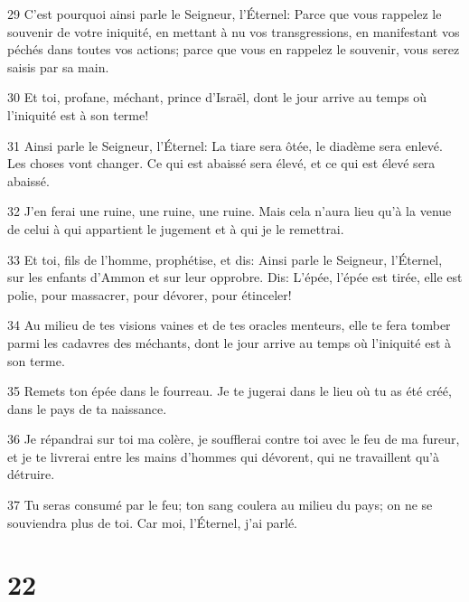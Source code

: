 \par 29 C'est pourquoi ainsi parle le Seigneur, l'Éternel: Parce que vous rappelez le souvenir de votre iniquité, en mettant à nu vos transgressions, en manifestant vos péchés dans toutes vos actions; parce que vous en rappelez le souvenir, vous serez saisis par sa main.
\par 30 Et toi, profane, méchant, prince d'Israël, dont le jour arrive au temps où l'iniquité est à son terme!
\par 31 Ainsi parle le Seigneur, l'Éternel: La tiare sera ôtée, le diadème sera enlevé. Les choses vont changer. Ce qui est abaissé sera élevé, et ce qui est élevé sera abaissé.
\par 32 J'en ferai une ruine, une ruine, une ruine. Mais cela n'aura lieu qu'à la venue de celui à qui appartient le jugement et à qui je le remettrai.
\par 33 Et toi, fils de l'homme, prophétise, et dis: Ainsi parle le Seigneur, l'Éternel, sur les enfants d'Ammon et sur leur opprobre. Dis: L'épée, l'épée est tirée, elle est polie, pour massacrer, pour dévorer, pour étinceler!
\par 34 Au milieu de tes visions vaines et de tes oracles menteurs, elle te fera tomber parmi les cadavres des méchants, dont le jour arrive au temps où l'iniquité est à son terme.
\par 35 Remets ton épée dans le fourreau. Je te jugerai dans le lieu où tu as été créé, dans le pays de ta naissance.
\par 36 Je répandrai sur toi ma colère, je soufflerai contre toi avec le feu de ma fureur, et je te livrerai entre les mains d'hommes qui dévorent, qui ne travaillent qu'à détruire.
\par 37 Tu seras consumé par le feu; ton sang coulera au milieu du pays; on ne se souviendra plus de toi. Car moi, l'Éternel, j'ai parlé.

\chapter{22}

